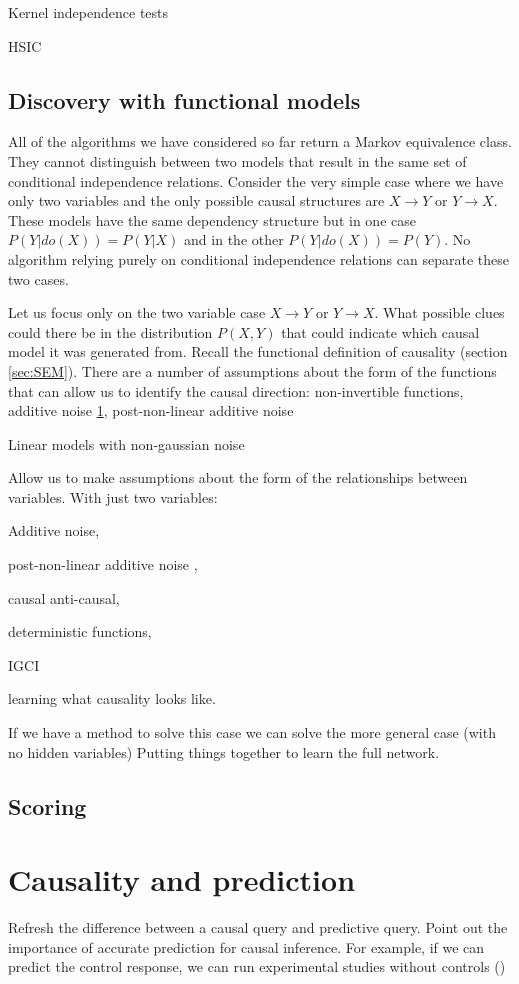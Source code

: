 \documentclass[11pt,a4paper]{article}
\begin{document}
\cite{Zhang2012} Kernel independence tests

HSIC \cite{Gretton2008}

\subsection{Discovery with functional models}
All of the algorithms we have considered so far return a Markov equivalence class. They cannot distinguish between two models that result in the same set of conditional independence relations. Consider the very simple case where we have only two variables and the only possible causal structures are $X \rightarrow Y$ or $Y \rightarrow X$. These models have the same dependency structure but in one case $P(Y|do(X)) = P(Y|X)$ and in the other $P(Y|do(X)) = P(Y)$. No algorithm relying purely on conditional independence relations can separate these two cases. 

Let us focus only on the two variable case $X \rightarrow Y$ or $Y \rightarrow X$. What possible clues could there be in the distribution $P(X,Y)$ that could indicate which causal model it was generated from. Recall the functional definition of causality (section \ref{sec:SEM}). There are a number of assumptions about the form of the functions that can allow us to identify the causal direction: non-invertible functions, additive noise \ref{}, post-non-linear additive noise 


Linear models with non-gaussian noise \cite{Hoyer2012}

Allow us to make assumptions about the form of the relationships between variables.
With just two variables:

Additive noise, \cite{Hoyer2009}

post-non-linear additive noise \cite{Zhang2008a}, 

causal anti-causal, 

deterministic functions,

IGCI \cite{Janzing2012a}

learning what causality looks like.

If we have a method to solve this case we can solve the more general case (with no hidden variables) Putting things together to learn the full network. 


\subsection{Scoring}


\section{Causality and prediction}
Refresh the difference between a causal query and predictive query.
Point out the importance of accurate prediction for causal inference. For example, if we can predict the control response, we can run experimental studies without controls (\cite{Brodersen2013})
\end{document}
